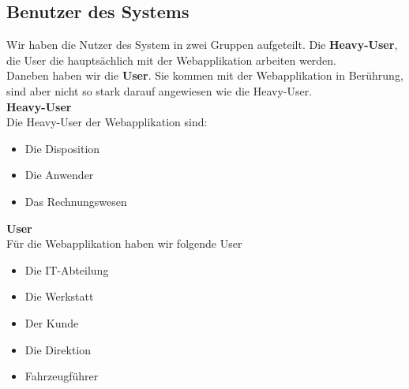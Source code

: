 \subsection{Benutzer des Systems}
Wir haben die Nutzer des System in zwei Gruppen aufgeteilt. Die \textbf{Heavy-User}, die User die hauptsächlich mit der Webapplikation arbeiten werden.\\
Daneben haben wir die \textbf{User}. Sie kommen mit der Webapplikation in Berührung, sind aber nicht so stark darauf angewiesen wie die Heavy-User.\\[2ex]
%
\textbf{Heavy-User}\\
Die Heavy-User der Webapplikation sind:
\begin{itemize}
\item Die Disposition
\item Die Anwender
\item Das Rechnungswesen
\end{itemize}
%
\textbf{User}\\
Für die Webapplikation haben wir folgende User
\begin{itemize}
\item Die IT-Abteilung
\item Die Werkstatt
\item Der Kunde
\item Die Direktion
\item Fahrzeugführer
\end{itemize}